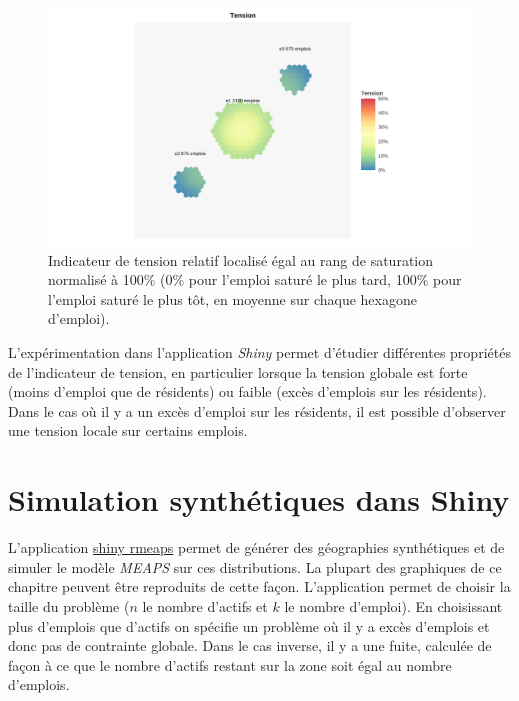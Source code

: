 \documentclass[
  10pt,
  a4paper,
  numbers=noendperiod,
  DIV=9]{scrartcl}
\begin{document}
\begin{figure}[htb]

{\centering \includegraphics[width=1\textwidth,height=\textheight]{output/carte_erg.png}

}

\caption[Indicateur de tension]{\label{fig-carte_erg}Indicateur de
tension relatif localisé égal au rang de saturation normalisé à 100\%
(0\% pour l'emploi saturé le plus tard, 100\% pour l'emploi saturé le
plus tôt, en moyenne sur chaque hexagone d'emploi).}

\end{figure}

L'expérimentation dans l'application \emph{Shiny} permet d'étudier
différentes propriétés de l'indicateur de tension, en particulier
lorsque la tension globale est forte (moins d'emploi que de résidents)
ou faible (excès d'emplois sur les résidents). Dans le cas où il y a un
excès d'emploi sur les résidents, il est possible d'observer une tension
locale sur certains emplois.

\hypertarget{simulation-synthuxe9tiques-dans-shiny}{%
\section{Simulation synthétiques dans
Shiny}\label{simulation-synthuxe9tiques-dans-shiny}}

L'application \href{https://ofce.shinyapps.io./rmeaps/}{shiny rmeaps}
permet de générer des géographies synthétiques et de simuler le modèle
\emph{MEAPS} sur ces distributions. La plupart des graphiques de ce
chapitre peuvent être reproduits de cette façon. L'application permet de
choisir la taille du problème (\(n\) le nombre d'actifs et \(k\) le
nombre d'emploi). En choisissant plus d'emplois que d'actifs on spécifie
un problème où il y a excès d'emplois et donc pas de contrainte globale.
Dans le cas inverse, il y a une fuite, calculée de façon à ce que le
nombre d'actifs restant sur la zone soit égal au nombre d'emplois.
\end{document}
